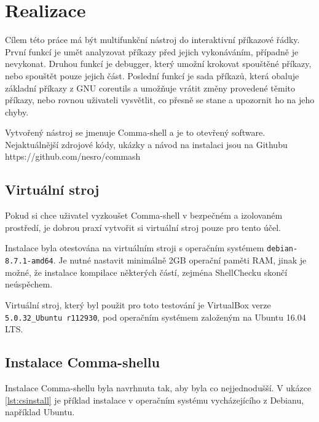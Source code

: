 \documentclass[thesis=M,czech]{FITthesis}[2012/06/26]
\begin{document}


\chapter{Realizace}

Cílem této práce má být multifunkční nástroj do interaktivní příkazové řádky. První funkcí je umět analyzovat příkazy před jejich vykonáváním, případně je nevykonat. Druhou funkcí je debugger, který umožní krokovat spouštěné příkazy, nebo spouštět pouze jejich část. Poslední funkcí je sada příkazů, která obaluje základní příkazy z GNU coreutils a umožňuje vrátit změny provedené těmito příkazy, nebo rovnou uživateli vysvětlit, co přesně se stane a upozornit ho na jeho chyby.

Vytvořený nástroj se jmenuje Comma-shell a je to otevřený software. Nejaktuálnější zdrojové kódy, ukázky a návod na instalaci jsou na Githubu https://github.com/nesro/commash

%
\section{Virtuální stroj}

Pokud si chce uživatel vyzkoušet Comma-shell v bezpečném a izolovaném prostředí, je dobrou praxí vytvořit si virtuální stroj pouze pro tento účel.

Instalace byla otestována na virtuálním stroji s operačním systémem \texttt{debian-8.7.1-amd64}. Je nutné nastavit minimálně 2GB operační paměti RAM, jinak je možné, že instalace kompilace některých částí, zejména ShellChecku skončí neúspěchem.

Virtuální stroj, který byl použit pro toto testování je VirtualBox verze \texttt{5.0.32\_Ubuntu r112930}, pod operačním systémem založeným na Ubuntu 16.04 LTS.




\section{Instalace Comma-shellu}

Instalace Comma-shellu byla navrhnuta tak, aby byla co nejjednodušší. V ukázce \ref{lst:csinstall} je příklad instalace v operačním systému vycházejícího z Debianu, například Ubuntu.
\end{document}
